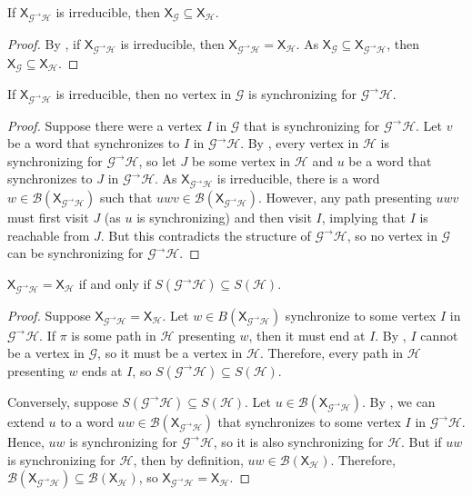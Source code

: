 \documentclass[hidelinks]{article}
\newcommand{\Gc}{\mathcal{G}}  %
\newcommand{\Hc}{\mathcal{H}}  %
\newcommand{\Bc}{\mathcal{B}}
\newcommand{\GtH}{{\Gc^\to\Hc}}
\newcommand{\shift}[1]{\mathsf{X}_{#1}}
\theoremstyle{definition}
\begin{document}
\begin{corollary}
    If \(\shift{\GtH}\) is irreducible, then \(\shift{\Gc} \subseteq \shift{\Hc}\).
\end{corollary}

\begin{proof}
    By , if \(\shift{\GtH}\) is irreducible, then \(\shift{\GtH} = \shift{\Hc}\).
    As \(\shift{\Gc} \subseteq \shift{\GtH}\), then \(\shift{\Gc} \subseteq \shift{\Hc}\).
\end{proof}

\begin{theorem}\label{nogsync}
    If \(\shift{\GtH}\) is irreducible, then no vertex in \(\Gc\) is synchronizing for \(\GtH\).
\end{theorem}

\begin{proof}
    Suppose there were a vertex \(I\) in \(\Gc\) that is synchronizing for \(\GtH\). 
    Let \(v\) be a word that synchronizes to \(I\) in \(\GtH\). By , every vertex in \(\Hc\) 
    is synchronizing for \(\GtH\), so let \(J\) be some vertex in \(\Hc\) and \(u\) be a word that synchronizes to 
    \(J\) in \(\GtH\). As \(\shift{\GtH}\) is irreducible, there is a word \(w \in \Bc(\shift{\GtH})\) 
    such that \(uwv \in \Bc(\shift{\GtH})\). However, any path presenting \(uwv\) must first visit 
    \(J\) (as \(u\) is synchronizing) and then visit \(I\), implying that \(I\) is reachable 
    from \(J\). But this contradicts the structure of \(\GtH\), so no vertex in \(\Gc\) can be 
    synchronizing for \(\GtH\).
\end{proof}

\begin{theorem}
    \(\shift{\GtH} = \shift{\Hc}\) if and only if \(S(\GtH) \subseteq S(\Hc)\).
\end{theorem}

\begin{proof}
    Suppose \(\shift{\GtH} = \shift{\Hc}\). Let \(w \in B(\shift{\GtH})\) synchronize to some vertex \(I\)
    in \(\GtH\).
    If \(\pi\) is some path in \(\Hc\) presenting \(w\), then it must end at \(I\). By 
    , \(I\) cannot be a vertex in \(\Gc\), so it must be a vertex in \(\Hc\).
    Therefore, every path in \(\Hc\) presenting \(w\) ends at \(I\), so \(S(\GtH) \subseteq S(\Hc)\).

    Conversely, suppose \(S(\GtH) \subseteq S(\Hc)\). Let \(u \in \Bc(\shift{\GtH})\).
    By , we can extend \(u\) to a word \(uw \in \Bc(\shift{\GtH})\) that 
    synchronizes to some vertex \(I\) in \(\GtH\). Hence, \(uw\) is synchronizing 
    for \(\GtH\), so it is also synchronizing for \(\Hc\). But if \(uw\) is synchronizing for
    \(\Hc\), then by definition, \(uw \in \Bc(\shift{\Hc})\). Therefore, \(\Bc(\shift{\GtH}) \subseteq \Bc(\shift{\Hc})\),
    so \(\shift{\GtH} = \shift{\Hc}\).
\end{proof}
\end{document}

